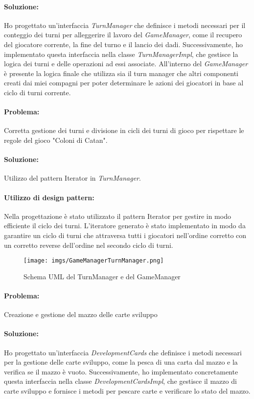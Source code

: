 \documentclass[a4paper,12pt]{report}
\begin{document}
\paragraph{Soluzione:}Ho progettato un'interfaccia \textit{TurnManager} che definisce i metodi necessari per il conteggio dei turni per alleggerire il lavoro del \textit{GameManager}, come il recupero del giocatore corrente, la fine del turno e il lancio dei dadi. Successivamente, ho implementato questa interfaccia nella classe \textit{TurnManagerImpl}, che gestisce la logica dei turni e delle operazioni ad essi associate.
 All'interno del \textit{GameManager} è presente la logica finale che utilizza sia il turn manager che altri componenti creati dai miei compagni per poter determinare le azioni dei giocatori in base al ciclo di turni corrente.
\paragraph{Problema:}Corretta gestione dei turni e divisione in cicli dei turni di gioco per rispettare le regole del gioco "Coloni di Catan".
\paragraph{Soluzione:}Utilizzo del pattern Iterator in \textit{TurnManager}.
\paragraph{Utilizzo di design pattern:}Nella progettazione è stato utilizzato il pattern Iterator per gestire in modo efficiente il ciclo dei turni. L'iteratore generato è stato implementato in modo da garantire un ciclo di turni che attraversa tutti i giocatori nell'ordine corretto con un corretto reverse dell'ordine nel secondo ciclo di turni.
\begin{figure}[H]
\centering{}
\texttt{[image: imgs/GameManagerTurnManager.png]}
\caption{Schema UML del TurnManager e del GameManager}
\label{img:analysis}
\end{figure}
\paragraph{Problema:}Creazione e gestione del mazzo delle carte sviluppo
\paragraph{Soluzione:}Ho progettato un'interfaccia \textit{DevelopmentCards} che definisce i metodi necessari per la gestione delle carte sviluppo, come la pesca di una carta dal mazzo e la verifica se il mazzo è vuoto. Successivamente, ho implementato concretamente questa interfaccia nella classe \textit{DevelopmentCardsImpl}, che gestisce il mazzo di carte sviluppo e fornisce i metodi per pescare carte e verificare lo stato del mazzo.
\end{document}
